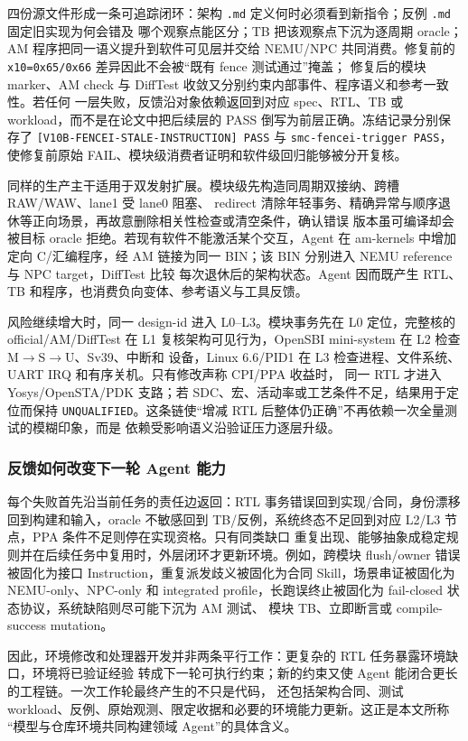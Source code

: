 \documentclass[UTF8,a4paper,zihao=-4,oneside]{ctexart}
\newcommand{\statusword}[1]{\texttt{#1}}
\begin{document}
四份源文件形成一条可追踪闭环：架构 \texttt{.md} 定义何时必须看到新指令；反例 \texttt{.md} 固定旧实现为何会错及
哪个观察点能区分；TB 把该观察点下沉为逐周期 oracle；AM 程序把同一语义提升到软件可见层并交给
NEMU/NPC 共同消费。修复前的 \texttt{x10=0x65/0x66} 差异因此不会被“既有 fence 测试通过”掩盖；
修复后的模块 marker、AM check 与 DiffTest 收敛又分别约束内部事件、程序语义和参考一致性。若任何
一层失败，反馈沿对象依赖返回到对应 spec、RTL、TB 或 workload，而不是在论文中把后续层的 PASS
倒写为前层正确。冻结记录分别保存了
\texttt{[V10B-FENCEI-STALE-INSTRUCTION] PASS} 与 \texttt{smc-fencei-trigger PASS}，使修复前原始
FAIL、模块级消费者证明和软件级回归能够被分开复核。

同样的生产主干适用于双发射扩展。模块级先构造同周期双接纳、跨槽 RAW/WAW、lane1 受 lane0 阻塞、
redirect 清除年轻事务、精确异常与顺序退休等正向场景，再故意删除相关性检查或清空条件，确认错误
版本虽可编译却会被目标 oracle 拒绝。若现有软件不能激活某个交互，Agent 在 am-kernels 中增加定向
C/汇编程序，经 AM 链接为同一 BIN；该 BIN 分别进入 NEMU reference 与 NPC target，DiffTest 比较
每次退休后的架构状态。Agent 因而既产生 RTL、TB 和程序，也消费负向变体、参考语义与工具反馈。

风险继续增大时，同一 design-id 进入 L0--L3。模块事务先在 L0 定位，完整核的 official/AM/DiffTest
在 L1 复核架构可见行为，OpenSBI mini-system 在 L2 检查 M$\rightarrow$S$\rightarrow$U、Sv39、中断和
设备，Linux 6.6/PID1 在 L3 检查进程、文件系统、UART IRQ 和有序关机。只有修改声称 CPI/PPA 收益时，
同一 RTL 才进入 Yosys/OpenSTA/PDK 支路；若 SDC、宏、活动率或工艺条件不足，结果用于定位而保持
\statusword{UNQUALIFIED}。这条链使“增减 RTL 后整体仍正确”不再依赖一次全量测试的模糊印象，而是
依赖受影响语义沿验证压力逐层升级。

\subsubsection{反馈如何改变下一轮 Agent 能力}

每个失败首先沿当前任务的责任边返回：RTL 事务错误回到实现/合同，身份漂移回到构建和输入，oracle
不敏感回到 TB/反例，系统终态不足回到对应 L2/L3 节点，PPA 条件不足则停在实现资格。只有同类缺口
重复出现、能够抽象成稳定规则并在后续任务中复用时，外层闭环才更新环境。例如，跨模块 flush/owner
错误被固化为接口 Instruction，重复派发歧义被固化为合同 Skill，场景串证被固化为 NEMU-only、NPC-only
和 integrated profile，长跑误终止被固化为 fail-closed 状态协议，系统缺陷则尽可能下沉为 AM 测试、
模块 TB、立即断言或 compile-success mutation。

因此，环境修改和处理器开发并非两条平行工作：更复杂的 RTL 任务暴露环境缺口，环境将已验证经验
转成下一轮可执行约束；新的约束又使 Agent 能闭合更长的工程链。一次工作轮最终产生的不只是代码，
还包括架构合同、测试 workload、反例、原始观测、限定收据和必要的环境能力更新。这正是本文所称
“模型与仓库环境共同构建领域 Agent”的具体含义。
\end{document}

